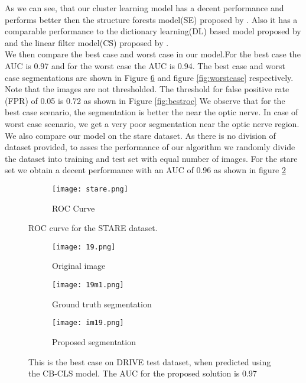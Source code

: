 As we can see, that our cluster learning model has a decent performance and performs better then the structure forests model(SE) proposed by \citep{dollar2013structured}. Also it has a comparable performance to the dictionary learning(DL) based model proposed by \citep{rigamonti2013learning}  and the linear filter model(CS) proposed by \cite{rigamonti2012accurate}.\\

We then compare the best case and worst case in our model.For the best case the AUC is 0.97 and for the worst case the AUC is 0.94. The best case and worst case segmentations are shown in Figure \ref{fig:bestcase} and figure \ref{fig:worstcase} respectively. Note that the images are not thresholded. The threshold for false positive rate (FPR) of 0.05 is 0.72 as shown in Figure \ref{fig:bestroc} We observe that for the best case scenario, the segmentation is better the near the optic nerve. In case of worst case scenario, we get a very poor segmentation near the optic nerve region.\\

We also compare our model on the stare dataset. As there is no division of dataset provided, to asses the performance of our algorithm we randomly divide the dataset into training and test set with equal number of images. For the stare set we obtain a decent performance with an AUC of 0.96 as shown in figure \ref{fig:stare}
\begin{figure}
	\centering
	
	\begin{subfigure}[b]{0.75\textwidth}
		\texttt{[image: stare.png]}
		\caption{ROC Curve}
		\label{fig:stare1}
	\end{subfigure}
	\caption[ROC curve on a train test split of STARE dataset]{ROC curve for the STARE dataset.}
	\label{fig:stare}
\end{figure}

\begin{figure}
	\centering
	\begin{subfigure}[b]{0.3\textwidth}
		\texttt{[image: 19.png]}
		\caption{Original image}
		\label{fig:191}
	\end{subfigure}
	\begin{subfigure}[b]{0.3\textwidth}
		\texttt{[image: 19m1.png]}
		\caption{Ground truth segmentation}
		\label{fig:192}
	\end{subfigure}
	\begin{subfigure}[b]{0.3\textwidth}
		\texttt{[image: im19.png]}
		\caption{Proposed segmentation}
		\label{fig:193}
	\end{subfigure}
	\caption[Best case on DRIVE test dataset using cluster learning]{This is the best case on DRIVE test dataset, when predicted using the CB-CLS model. The AUC for the proposed solution is 0.97}
	\label{fig:bestcase}
\end{figure}

